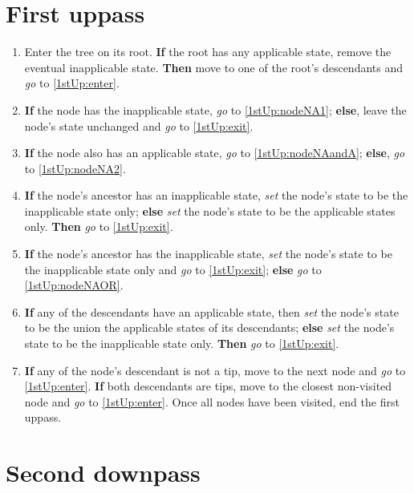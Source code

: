\documentclass[a4paper,12pt]{article}
\begin{document}
\section{First uppass} \label{1stUp}

\begin{enumerate}
    \item Enter the tree on its root. \textbf{If} the root has any applicable state, remove the eventual inapplicable state. \textbf{Then} move to one of the root's descendants and \textit{go} to \ref{1stUp:enter}.
    \item \label{1stUp:enter} \textbf{If} the node has the inapplicable state, \textit{go} to \ref{1stUp:nodeNA1}; \textbf{else}, leave the node's state unchanged and \textit{go} to \ref{1stUp:exit}.
    \item \label{1stUp:nodeNA1} \textbf{If} the node also has an applicable state, \textit{go} to \ref{1stUp:nodeNAandA}; \textbf{else}, \textit{go} to \ref{1stUp:nodeNA2}.
    \item \label{1stUp:nodeNAandA} \textbf{If} the node's ancestor has an inapplicable state, \textit{set} the node's state to be the inapplicable state only; \textbf{else} \textit{set} the node's state to be the applicable states only. \textbf{Then} \textit{go} to \ref{1stUp:exit}.
    \item \label{1stUp:nodeNA2} \textbf{If} the node's ancestor has the inapplicable state, \textit{set} the node's state to be the inapplicable state only and \textit{go} to \ref{1stUp:exit}; \textbf{else} \textit{go} to \ref{1stUp:nodeNAOR}.
    \item \label{1stUp:nodeNAOR} \textbf{If} any of the descendants have an applicable state, then \textit{set} the node's state to be the union the applicable states of its descendants; \textbf{else} \textit{set} the node's state to be the inapplicable state only. \textbf{Then} \textit{go} to \ref{1stUp:exit}.
    \item \label{1stUp:exit} \textbf{If} any of the node's descendant is not a tip, move to the next node and \textit{go} to \ref{1stUp:enter}. \textbf{If} both descendants are tips, move to the closest non-visited node and \textit{go} to \ref{1stUp:enter}. Once all nodes have been visited, end the first uppass.
\end{enumerate}


\section{Second downpass} \label{2ndDp}
\end{document}
